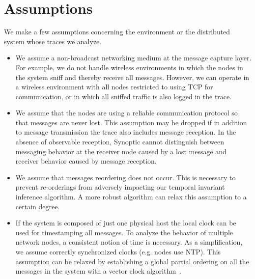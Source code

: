 \section{Assumptions}
\label{sec:assumptions}

We make a few assumptions concerning the environment or the
distributed system whose traces we analyze.

\begin{itemize}

\item We assume a non-broadcast networking medium at the message
  capture layer. For example, we do not handle wireless environments
  in which the nodes in the system sniff and thereby receive all
  messages. However, we can operate in a wireless environment with all
  nodes restricted to using TCP for communication, or in which all
  sniffed traffic is also logged in the trace.

\item We assume that the nodes are using a reliable communication
  protocol so that messages are never lost. This assumption may be
  dropped if in addition to message transmission the trace also
  includes message reception. In the absence of observable reception,
  Synoptic cannot distinguish between messaging behavior at the
  receiver node caused by a lost message and receiver behavior caused
  by message reception.

\item We assume that messages reordering does not occur. This is
  necessary to prevent re-orderings from adversely impacting our
  temporal invariant inference algorithm. A more robust algorithm can
  relax this assumption to a certain degree.



\item If the system is composed of just one physical host the local
  clock can be used for timestamping all messages. To analyze the
  behavior of multiple network nodes, a consistent notion of time is
  necessary. As a simplification, we assume correctly synchronized
  clocks (e.g. nodes use NTP). This assumption can be relaxed by
  establishing a global partial ordering on all the messages in the
  system with a vector clock algorithm~\cite{LamportClocks}.


\end{itemize}